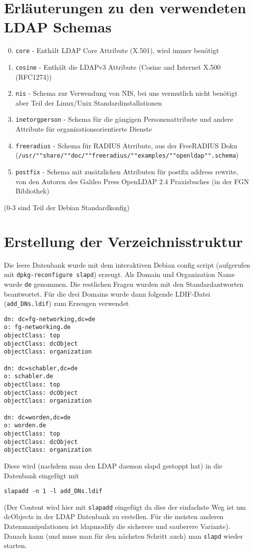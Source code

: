 \documentclass[11pt,a4paper,titlepage=firstiscover,headsepline,bibtotoc]{scrartcl} %
\begin{document}
\section{Erläuterungen zu den verwendeten LDAP Schemas}\label{sec:LDAP-Schema}
\begin{enumerate}
\setcounter{enumi}{-1}
\item \texttt{core} - Enthält LDAP Core Attribute (X.501), wird immer benötigt
\item \texttt{cosine} - Enthält die LDAPv3 Attribute (Cosine and Internet X.500 (RFC1274))
\item \texttt{nis} - Schema zur Verwendung von NIS, bei uns vermutlich nicht benötigt aber Teil der Linux/Unix Standardinstallationen
\item \texttt{inetorgperson} - Schema für die gängigen Personenattribute und andere Attribute für organisationsorientierte Dienste
\item \texttt{freeradius} - Schema für RADIUS Atrribute, aus der FreeRADIUS Doku (\texttt{/usr/""share/""doc/""freeradius/""examples/""openldap"".schema})
\item \texttt{postfix} - Schema mit zusätzlichen Attributen für postfix address rewrite, von den Autoren des Galileo Press OpenLDAP 2.4 Praxisbuches (in der FGN Bibliothek)
\end{enumerate}
(0-3 sind Teil der Debian Standardkonfig)

\newpage
\section{Erstellung der Verzeichnisstruktur}\label{sec:Erstelle-DB}
Die leere Datenbank wurde mit dem interaktiven Debian config script (aufgerufen mit \texttt{dpkg-reconfigure slapd}) erzeugt. Als Domain und Organization Name wurde \texttt{de} genommen. Die restlichen Fragen wurden mit den Standardantworten beantwortet. Für die drei Domains wurde dann folgende LDIF-Datei (\texttt{add\_DNs.ldif}) zum Erzeugen verwendet
\begin{lstlisting}
dn: dc=fg-networking,dc=de
o: fg-networking.de
objectClass: top
objectClass: dcObject
objectClass: organization

dn: dc=schabler,dc=de
o: schabler.de
objectClass: top
objectClass: dcObject
objectClass: organization

dn: dc=worden,dc=de
o: worden.de
objectClass: top
objectClass: dcObject
objectClass: organization

\end{lstlisting}
Diese wird (nachdem man den LDAP daemon slapd gestoppt hat) in die Datenbank eingefügt mit
\begin{lstlisting}
slapadd -n 1 -l add_DNs.ldif
\end{lstlisting}
(Der Content wird hier mit \texttt{slapadd} eingefügt da dies der einfachste Weg ist um dcObjects in der LDAP Datenbank zu erstellen. Für die meisten anderen Datenmanipulationen ist ldapmodify die sicherere und sauberere Variante). Danach kann (und muss man für den nächsten Schritt auch) man \texttt{slapd} wieder starten.
\end{document}
